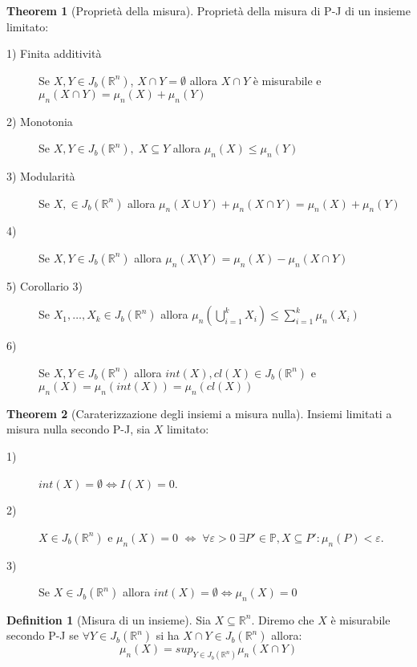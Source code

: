 \documentclass[leqno]{article}
\theoremstyle{definition}
\newtheorem{definition}{Definition}[section]
\numberwithin{equation}{section}
\newtheorem{theorem}{Theorem}[section]
\theoremstyle{remark}
\begin{document}
	\begin{theorem}[Proprietà della misura]
		Proprietà della misura di P-J di un insieme limitato:
		\begin{description}
			\item[1) Finita additività] Se $X,Y\in J_b(\mathbb{R}^n)$, $X\cap Y = \emptyset$ allora $X\cap Y$ è misurabile e $\mu_n(X\cap Y)=\mu_n(X)+\mu_n(Y)$
			\item[2) Monotonia] Se $X,Y\in J_b(\mathbb{R}^n), \; X \subseteq Y$ allora $\mu_n(X)\le\mu_n(Y)$
			\item[3) Modularità] Se $X,\in J_b(\mathbb{R}^n)$ allora $\mu_n(X\cup Y)+\mu_n(X\cap Y)=\mu_n(X)+\mu_n(Y)$
			\item [4)] Se $X,Y\in J_b(\mathbb{R}^n)$ allora $\mu_n(X \setminus Y)=\mu_n(X)-\mu_n(X\cap Y)$
			\item [5) Corollario 3) ] Se $X_1,\dots, X_k \in J_b(\mathbb{R}^n)$ allora $\mu_n \left(\bigcup_{i=1}^k X_i\right)\le \sum_{i=1}^k \mu_n(X_i) $
			\item[6) ] Se $X,Y\in J_b(\mathbb{R}^n)$ allora $int(X),cl(X)\in J_b(\mathbb{R}^n)$ e $\mu_n(X)=\mu_n(int(X))=\mu_n(cl(X))$
		\end{description}
	\end{theorem}
	\begin{theorem}[Caraterizzazione degli insiemi a misura nulla]
		Insiemi limitati a misura nulla secondo P-J, sia $X$ limitato:
		\begin{description}
			\item[1)] $int(X)=\emptyset \Leftrightarrow I(X)=0$.
			\item[2)] $X\in J_b(\mathbb{R}^n)$ e $\mu_n(X)=0$ $\Leftrightarrow \; \forall \varepsilon > 0 \; \exists P'\in \mathbb{P}, X \subseteq P' : \mu_n(P)<\varepsilon$. 
			\item[3)] Se $X \in J_b(\mathbb{R}^n)$ allora $int(X)=\emptyset \Leftrightarrow \mu_n(X)=0$
		\end{description}
	\end{theorem}
	
	\begin{definition}[Misura di un insieme]
		Sia $X\subseteq \mathbb{R}^n$. Diremo che $X$ è misurabile secondo P-J se $\forall Y \in J_b(\mathbb{R}^n)$ si ha $X \cap Y \in J_b(\mathbb{R}^n)$ allora:
		\begin{equation}
			\mu_n(X)=sup_{Y \in J_b(\mathbb{R}^n)}\mu_n(X \cap Y)
		\end{equation}
	\end{definition}
	
\end{document}
